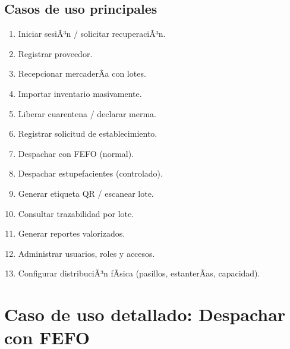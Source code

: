 ﻿\documentclass[a4paper, 12pt]{article}
\begin{document}
\subsection{Casos de uso principales}
\begin{enumerate}
    \item Iniciar sesiÃ³n / solicitar recuperaciÃ³n.
    \item Registrar proveedor.
    \item Recepcionar mercaderÃ­a con lotes.
    \item Importar inventario masivamente.
    \item Liberar cuarentena / declarar merma.
    \item Registrar solicitud de establecimiento.
    \item Despachar con FEFO (normal).
    \item Despachar estupefacientes (controlado).
    \item Generar etiqueta QR / escanear lote.
    \item Consultar trazabilidad por lote.
    \item Generar reportes valorizados.
    \item Administrar usuarios, roles y accesos.
    \item Configurar distribuciÃ³n fÃ­sica (pasillos, estanterÃ­as, capacidad).
\end{enumerate}

\section{Caso de uso detallado: Despachar con FEFO}
\end{document}
